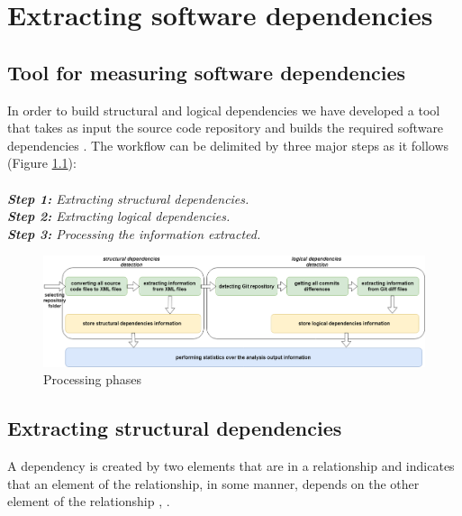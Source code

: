\documentclass[12pt]{mitthesis}
\begin{document}


\tableofcontents

\pagestyle{plain}



\chapter{Extracting software dependencies}
\label{extraction}

\section{Tool for measuring software dependencies}
\label{sec:tool}

In order to build structural and logical dependencies we have developed a tool that takes as input the source code repository and builds the required software dependencies \cite{DepSACI}. The workflow can be delimited by three major steps as it follows (Figure \ref{fig:fig3}):\\ \\
\textit{\textbf{Step 1:} Extracting structural dependencies.}\\
\textit{\textbf{Step 2:} Extracting logical dependencies.}\\
\textit{\textbf{Step 3:} Processing the information extracted.}

\begin{figure}[H]
\centering
\includegraphics[width=\textwidth]{fig3.png}
\caption{Processing phases}
\label{fig:fig3}
\end{figure}


\section{Extracting structural dependencies}

A dependency is created by two elements that are in a relationship and indicates that an element of the relationship, in some manner, depends on the other element of the relationship \cite{Booch:2004:OAD:975416}, \cite{Cataldo2009SoftwareDW}.
\end{document}
